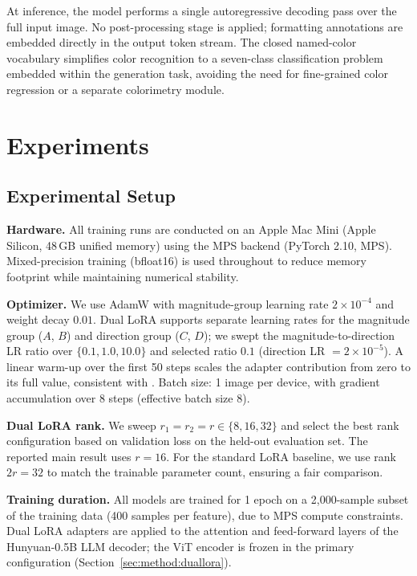 \documentclass[10pt,twocolumn]{article}
\begin{document}
At inference, the model performs a single autoregressive decoding pass over the
full input image. No post-processing stage is applied; formatting annotations
are embedded directly in the output token stream. The closed named-color
vocabulary simplifies color recognition to a seven-class classification problem
embedded within the generation task, avoiding the need for fine-grained color
regression or a separate colorimetry module.

\section{Experiments}
\label{sec:experiments}

\subsection{Experimental Setup}
\label{sec:experiments:setup}

\textbf{Hardware.} All training runs are conducted on an Apple Mac Mini (Apple
Silicon, 48\,GB unified memory) using the MPS backend (PyTorch 2.10, MPS).
Mixed-precision training (bfloat16) is used throughout to reduce memory
footprint while maintaining numerical stability.

\textbf{Optimizer.} We use AdamW with magnitude-group learning rate $2 \times
10^{-4}$ and weight decay $0.01$. Dual LoRA supports separate learning rates for
the magnitude group ($A$, $B$) and direction group ($C$, $D$); we swept the
magnitude-to-direction LR ratio over $\{0.1, 1.0, 10.0\}$ and selected ratio
$0.1$ (direction LR $= 2\times10^{-5}$). A linear warm-up over the first 50
steps scales the adapter contribution from zero to its full value, consistent
with \citet{xu2025duallora}. Batch size: 1 image per device, with gradient
accumulation over 8 steps (effective batch size 8).

\textbf{Dual LoRA rank.} We sweep $r_1 = r_2 = r \in \{8, 16, 32\}$ and select
the best rank configuration based on validation loss on the held-out evaluation
set. The reported main result uses $r = 16$. For the standard LoRA
baseline, we use rank $2r = 32$ to match the trainable parameter count, ensuring
a fair comparison.

\textbf{Training duration.} All models are trained for 1 epoch on a 2{,}000-sample
subset of the training data (400 samples per feature), due to MPS compute
constraints. Dual LoRA
adapters are applied to the attention and feed-forward layers of the Hunyuan-0.5B
LLM decoder; the ViT encoder is frozen in the primary configuration
(Section~\ref{sec:method:duallora}).
\end{document}
